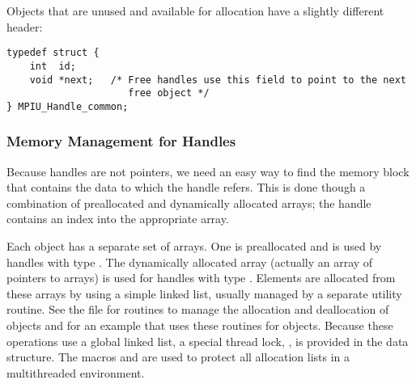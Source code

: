 \documentclass{article}
\begin{document}
Objects that are unused and available for allocation have a slightly
different header:
\begin{verbatim}
typedef struct {
    int  id;
    void *next;   /* Free handles use this field to point to the next
                     free object */
} MPIU_Handle_common;
\end{verbatim}

\subsubsection{Memory Management for Handles}
Because handles are not pointers, we need an easy way to find the
memory block that contains the data to which the handle refers.  
This is done though a combination of preallocated and dynamically
allocated arrays; the handle contains an index into the appropriate
array.  

Each object has a separate set of arrays.  One is preallocated and is
used by handles with type .  The dynamically
allocated array 
(actually an array of pointers to arrays) is used for handles with
type .  Elements are allocated from these
arrays by using a simple linked list, usually managed by a separate
utility routine.  See the file  for routines to
manage the allocation and deallocation of objects and
 for an example that uses these routines for
 objects.
Because these operations use a global linked list, a special thread
lock, , is provided in the 
data structure.  The macros  and
 are used to protect all allocation
lists in a multithreaded environment.
\end{document}
